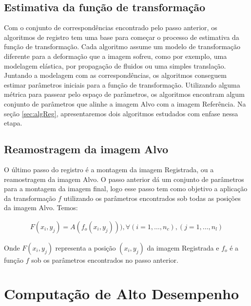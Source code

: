 \subsection{Estimativa da função de transformação}
    
Com o conjunto de correspondências encontrado pelo passo anterior, os algoritmos de registro tem uma base para 
começar o processo de estimativa da função de transformação. Cada algoritmo assume um modelo de transformação diferente
para a deformação que a imagem sofreu, como por exemplo, uma modelagem elástica, por propagação de fluidos ou uma
simples translação. Juntando a modelagem com as correspondências, os algoritmos conseguem estimar parâmetros iniciais
para a função de transformação. Utilizando alguma métrica para passear pelo espaço de parâmetros, os algoritmos encontram
algum conjunto de parâmetros que alinhe a imagem Alvo com a imagem Referência. Na seção \ref{sec:algReg}, apresentaremos
dois algoritmos estudados com enfase nessa etapa.

\subsection{Reamostragem da imagem Alvo}

O último passo do registro é a montagem da imagem Registrada, ou a reamostragem da imagem Alvo. O passo anterior
dá um conjunto de parâmetros para a montagem da imagem final, logo esse passo tem como objetivo a aplicação
da transformação $f$ utilizando os parâmetros encontrados sob todas as posições da imagem Alvo. Temos:

\begin{align}\label{eq:reamostragem}
    F(x_i,y_j) = A(f_o(x_i,y_j))), \forall (i = 1, \dots, n_c), (j = 1, \dots, n_l)
\end{align}

    Onde $F(x_i,y_j)$ representa a posição $(x_i,y_j)$ da imagem Registrada e $f_o$ é a função $f$ sob os parâmetros
encontrados no passo anterior.

\section{Computação de Alto Desempenho}\label{GPGPU}
    
